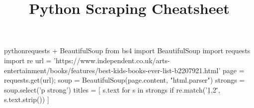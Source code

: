 \documentclass[10pt,a4paper]{article}
\title{\color{w3schools}Python Scraping Cheatsheet
}
\begin{document}
\maketitle
\small
\begin{multicols}{3}

\thispagestyle{empty}
\scriptsize

% 




\begin{codebox}{python}{requests + BeautifulSoup}
from bs4 import BeautifulSoup
import requests
import re
url = 'https://www.independent.co.uk/arts-entertainment/books/features/best-kids-books-ever-list-b2207921.html'
page = requests.get(url);
soup = BeautifulSoup(page.content, "html.parser")
strongs = soup.select('p strong')
titles = [ s.text for s in strongs if re.match('\d{1,2}\.', s.text.strip()) ]

\end{codebox}


\AtNextBibliography{\footnotesize}
\printbibliography  
\end{multicols}
\end{document}
